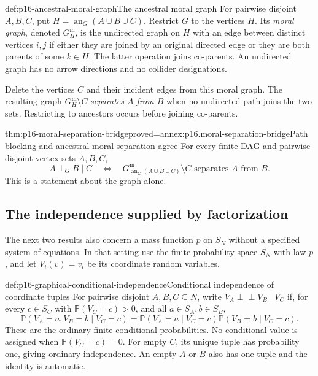 \begin{hbdefinition}{def:p16-ancestral-moral-graph}{The ancestral moral graph}
For pairwise disjoint \(A,B,C\), put
\(H=\operatorname{an}_G(A\cup B\cup C)\). Restrict \(G\) to
the vertices \(H\). Its \emph{moral graph}, denoted \(G_H^{\mathrm m}\),
is the undirected graph on \(H\) with an edge between distinct
vertices \(i,j\) if either they are joined by an original directed
edge or they are both parents of some \(k\in H\).
The latter operation joins co-parents. An undirected graph has no
arrow directions and no collider designations.

Delete the vertices \(C\) and their incident edges from this moral
graph. The resulting graph \(G_H^{\mathrm m}\setminus C\)
\emph{separates \(A\) from \(B\)} when no undirected path joins
the two sets. Restricting to ancestors occurs before joining co-parents.
\end{hbdefinition}

\begin{hbtheorem}{thm:p16-moral-separation-bridge}{proved=annex:p16.moral-separation-bridge}{Path blocking and ancestral moral separation agree}
For every finite DAG and pairwise disjoint vertex sets \(A,B,C\),
\[
 A\mathrel{\perp_G}B\mid C
 \quad\Longleftrightarrow\quad
 G_{\operatorname{an}_G(A\cup B\cup C)}^{\mathrm m}\setminus C
       \text{ separates }A\text{ from }B.
\]
This is a statement about the graph alone.
\end{hbtheorem}

\subsection{The independence supplied by factorization}

The next two results also concern a mass function \(p\) on \(S_N\)
without a specified system of equations. In that setting use the finite
probability space \(S_N\) with law \(p\), and let \(V_i(v)=v_i\)
be its coordinate random variables.

\begin{hbdefinition}{def:p16-graphical-conditional-independence}{Conditional independence of coordinate tuples}
For pairwise disjoint \(A,B,C\subseteq N\), write
\(V_A\mathrel{\perp\!\!\!\perp}V_B\mid V_C\) if, for every
\(c\in S_C\) with \(\mathbb P(V_C=c)>0\), and all
\(a\in S_A,b\in S_B\),
\[
 \mathbb P(V_A=a,V_B=b\mid V_C=c)
 =\mathbb P(V_A=a\mid V_C=c)
       \mathbb P(V_B=b\mid V_C=c).
\]
These are the ordinary finite conditional probabilities. No conditional
value is assigned when \(\mathbb P(V_C=c)=0\). For empty \(C\),
its unique tuple has probability one, giving ordinary independence.
An empty \(A\) or \(B\) also has one tuple and the identity is
automatic.
\end{hbdefinition}

